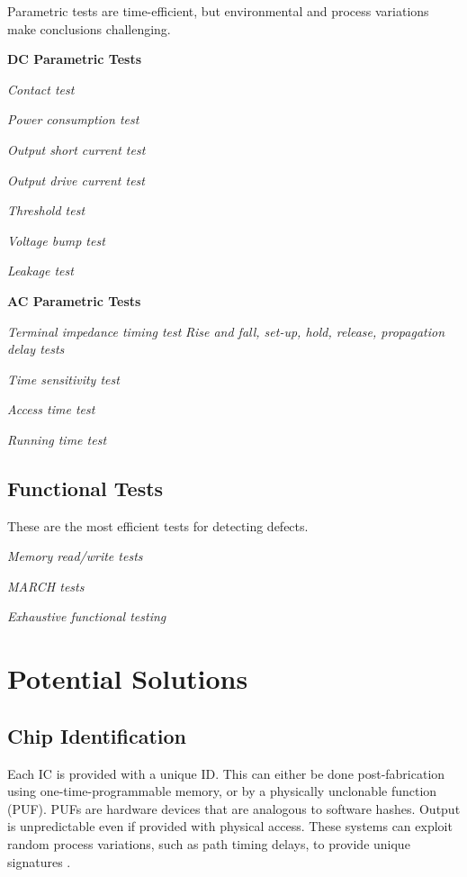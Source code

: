 \documentclass{IEEEtran}
\begin{document}
Parametric tests are time-efficient, but environmental and process variations make conclusions challenging. 



\textbf{DC Parametric Tests}

\textit{Contact test}

\textit{Power consumption test}

\textit{Output short current test}

\textit{Output drive current test}

\textit{Threshold test}

\textit{Voltage bump test}

\textit{Leakage test}

\textbf{AC Parametric Tests}



\textit{Terminal impedance timing test}
\textit{Rise and fall, set-up, hold, release, propagation delay tests}

\textit{Time sensitivity test}

\textit{Access time test}

\textit{Running time test}

\subsection{Functional Tests}

These are the most efficient tests for detecting defects. 

\textit{Memory read/write tests}

\textit{MARCH tests}

\textit{Exhaustive functional testing}

\section{Potential Solutions}


 
 
\subsection{Chip Identification}

 Each IC is provided with a unique ID. This can either be done post-fabrication using one-time-programmable memory, or by a physically unclonable function (PUF). PUFs are hardware devices that are analogous to software hashes. Output is unpredictable even if provided with physical access. These systems can exploit random process variations, such as path timing delays, to provide unique signatures \cite{LectureA}.
\end{document}
